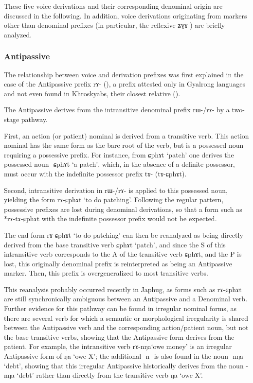 \documentclass[oldfontcommands,oneside,a4paper,11pt]{article}
\newcommand{\ipa}[1]{{\phon #1}} %
\begin{document}
These five voice derivations and their corresponding denominal origin are discussed in the following. In addition, voice derivations originating from markers other than denominal prefixes (in particular, the reflexive \ipa{ʑɣɤ-}) are briefly analyzed.

\subsubsection{Antipassive}
The relationship between voice and derivation prefixes was first explained in the case of the Antipassive prefix \ipa{rɤ-} (\citealt{jacques14antipassive}), a prefix attested only in Gyalrong languages and not even found in Khroskyabs, their closest relative (\citealt{lai13affixale}).


The Antipassive derives from the intransitive denominal prefix \ipa{rɯ-/rɤ-} by a two-stage pathway.

First, an action (or patient) nominal is derived from a transitive verb. This action nominal has the same form as the bare root of the verb, but is a possessed noun requiring a possessive prefix. For instance, from \ipa{ɕphɤt} `patch' one derives the possessed noun 
\ipa{-ɕphɤt} `a patch', which, in the absence of a definite possessor, must occur with the indefinite possessor prefix \ipa{tɤ-} (\ipa{tɤ-ɕphɤt}).

Second, intransitive derivation in \ipa{rɯ-/rɤ-} is applied to this possessed noun, yielding the form \ipa{rɤ-ɕphɤt} `to do patching'. Following the regular pattern, possessive prefixes are lost during denominal derivations, so that a form such as *\ipa{rɤ-tɤ-ɕphɤt} with the indefinite possessor prefix would not be expected.

The end form \ipa{rɤ-ɕphɤt} `to do patching' can then be reanalyzed as being directly derived from the base transitive verb \ipa{ɕphɤt} `patch', and since the S of this intransitive verb corresponds to the A of the transitive verb \ipa{ɕphɤt}, and the P is lost, this originally denominal prefix is reinterpreted as being an Antipassive marker. Then, this prefix is overgeneralized to most transitive verbs.

This reanalysis probably occurred recently in Japhug, as forms such as \ipa{rɤ-ɕphɤt} are still synchronically ambiguous between an Antipassive and a Denominal verb. Further evidence for this pathway can be found in irregular nominal forms, as there are several verb for which a semantic or morphological irregularity is shared between the Antipassive verb and the corresponding action/patient noun, but not the base transitive verbs, showing that the Antipassive form derives from the patient. For example, the intransitive verb \ipa{rɤ-nŋa}`owe money' is an irregular Antipassive form of \ipa{ŋa} `owe X'; the additional \ipa{-n-} is also found in the noun \ipa{-nŋa} `debt', showing that this irregular Antipassive historically derives from the noun \ipa{-nŋa} `debt' rather than directly from the transitive verb \ipa{ŋa} `owe X'. 
\end{document}
